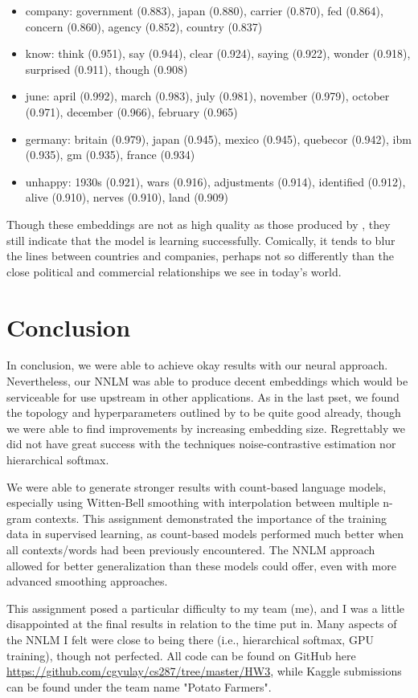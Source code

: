 \documentclass[11pt]{article}
\begin{document}
\begin{itemize}
  \item company: government (0.883), japan (0.880), carrier (0.870), fed (0.864), concern (0.860), agency (0.852), country (0.837)
  \item know: think (0.951), say (0.944), clear (0.924), saying (0.922), wonder (0.918), surprised (0.911), though (0.908)
  \item june: april (0.992), march (0.983), july (0.981), november (0.979), october (0.971), december (0.966), february (0.965)
  \item germany: britain (0.979), japan (0.945), mexico (0.945), quebecor (0.942), ibm (0.935), gm (0.935), france (0.934)
  \item unhappy: 1930s (0.921), wars (0.916), adjustments (0.914), identified (0.912), alive (0.910), nerves (0.910), land (0.909)
\end{itemize}

Though these embeddings are not as high quality as those produced by \citet{DBLP:journals/corr/MikolovSCCD13}, they still indicate that the model is learning successfully. Comically, it tends to blur the lines between countries and companies, perhaps not so differently than the close political and commercial relationships we see in today's world.

\section{Conclusion}

In conclusion, we were able to achieve okay results with our neural approach. Nevertheless, our NNLM was able to produce decent embeddings which would be serviceable for use upstream in other applications. As in the last pset, we found the topology and hyperparameters outlined by \citet{DBLP:journals/jmlr/BengioDVJ03} to be quite good already, though we were able to find improvements by increasing embedding size. Regrettably we did not have great success with the techniques noise-contrastive estimation nor hierarchical softmax.

We were able to generate stronger results with count-based language models, especially using Witten-Bell smoothing with interpolation between multiple n-gram contexts. This assignment demonstrated the importance of the training data in supervised learning, as count-based models performed much better when all contexts/words had been previously encountered. The NNLM approach allowed for better generalization than these models could offer, even with more advanced smoothing approaches.

This assignment posed a particular difficulty to my team (me), and I was a little disappointed at the final results in relation to the time put in. Many aspects of the NNLM I felt were close to being there (i.e., hierarchical softmax, GPU training), though not perfected. All code can be found on GitHub here \url{https://github.com/cgyulay/cs287/tree/master/HW3}, while Kaggle submissions can be found under the team name "Potato Farmers".



\end{document}
